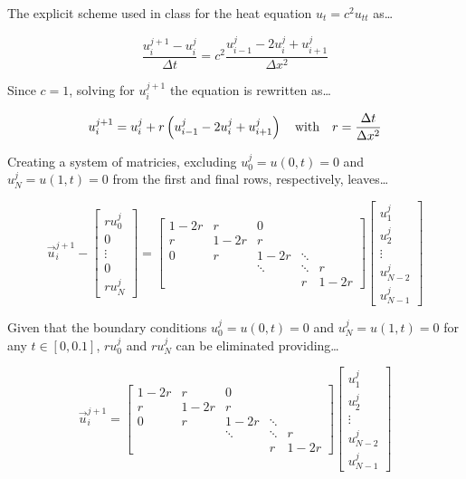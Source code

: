 \documentclass[12pt,letterpaper]{article}
\begin{document}
The explicit scheme used in class for the heat equation $u_t = c^2 u_{tt}$ as\ldots

\begin{equation*}
    \frac{u^{j+1}_{i}-u^{j}_{i}}{\Delta t} = c^2 \frac{u^{j}_{i-1}-2u^{j}_{i}+u^{j}_{i+1}}{\Delta x^2}
\end{equation*}

Since $c=1$, solving for $u^{j+1}_{i}$ the equation is rewritten as\ldots

\begin{equation*}
    u^{j+1}_{i} = u^{j}_{i} + r\left(u^{j}_{i-1}-2u^{j}_{i}+u^{j}_{i+1}\right) \\
    \quad \text{with} \quad r = \frac{\Delta t}{\Delta x^2}
\end{equation*}

Creating a system of matricies, excluding $u^{j}_{0} = u(0,t) = 0$ and $u^{j}_{N} = u(1,t) = 0$ from the first and final rows, respectively, leaves\ldots


\begin{equation*}
    \overrightarrow{u}^{j+1}_{i} - \begin{bmatrix} ru^{j}_{0} \\ 0 \\ \vdots \\ 0 \\ ru^{j}_{N} \end{bmatrix} = \begin{bmatrix} 1-2r & r & 0 & \\ r & 1-2r & r & & \\ 0 & r & 1-2r & \ddots & \\ & & \ddots & \ddots & r \\  & & & r & 1-2r \end{bmatrix} \begin{bmatrix} u^{j}_{1} \\ u^{j}_{2} \\ \vdots \\ u^{j}_{N-2} \\ u^{j}_{N-1} \end{bmatrix}
\end{equation*}


Given that the boundary conditions $u^{j}_{0} = u(0,t) = 0$ and $u^{j}_{N} = u(1,t) = 0$ for any $t \in [0,0.1]$, $ru^{j}_{0}$ and $ru^{j}_{N}$ can be eliminated providing\ldots

\begin{equation*}
    \overrightarrow{u} ^{j+1}_{i} = \begin{bmatrix} 1-2r & r & 0 & \\ r & 1-2r & r & & \\ 0 & r & 1-2r & \ddots & \\ & & \ddots & \ddots & r \\  & & & r & 1-2r \end{bmatrix} \begin{bmatrix} u^{j}_{1} \\ u^{j}_{2} \\ \vdots \\ u^{j}_{N-2} \\ u^{j}_{N-1} \end{bmatrix}
\end{equation*}
\end{document}
